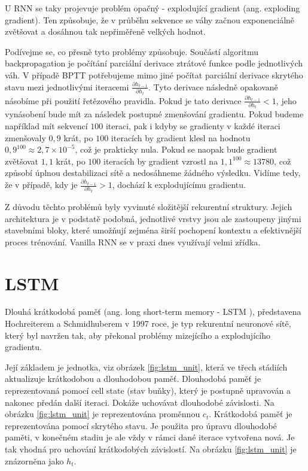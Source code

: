 U RNN se taky projevuje problém opačný - explodující gradient (ang. exploding
gradient). Ten způsobuje, že v průběhu sekvence se váhy začnou exponenciálně
zvětšovat a dosáhnou tak nepřiměřeně velkých hodnot.

Podívejme se, co přesně tyto problémy způsobuje. Součástí algoritmu
backpropagation je počítání parciální derivace ztrátové funkce podle
jednotlivých váh. V případě BPTT potřebujeme mimo jiné počítat parciální
derivace skrytého stavu mezi jednotlivými iteracemi $\frac{\partial
        h_{t-1}}{\partial h_t}$. Tyto derivace následně opakovaně násobíme při použití
řetězového pravidla. Pokud je tato derivace $\frac{\partial h_{t-1}}{\partial
        h_t}<1$, jeho vynásobení bude mít za následek postupné zmenšování gradientu.
Pokud budeme například mít sekvencí $100$ iteraci, pak i kdyby se gradienty v
každé iteraci zmenšovaly $0,9$ krát, po $100$ iteracích by gradient klesl na
hodnotu $0,9^{100} \approx 2,7 \times 10^{-5}$, což je prakticky nula. Pokud se
naopak bude gradient zvětšovat $1,1$ krát, po $100$ iteracích by gradient
vzrostl na $1,1^{100} \approx 13 780$, což způsobí úplnou destabilizaci sítě a
nedosáhneme žádného výsledku. Vidíme tedy, že v případě, kdy je $\frac{\partial
        h_{t-1}}{\partial h_t}>1$, dochází k explodujícímu gradientu.

Z důvodu těchto problémů byly vyvinuté složitější rekurentní struktury. Jejich
architektura je v podstatě podobná, jednotlivé vrstvy jsou ale zastoupeny
jinými stavebními bloky, které umožňují zejména širší pochopení kontextu a
efektivnější proces trénování. Vanilla RNN se v praxi dnes využívají velmi
zřídka.

\section{LSTM}
Dlouhá krátkodobá paměť (ang. long short-term memory - LSTM ), představena
Hochreiterem a Schmidhuberem v 1997 roce, je typ rekurentní neuronové sítě,
který byl navržen tak, aby překonal problémy mizejícího a explodujícího
gradientu.

Její základem je jednotka, viz obrázek \ref{fig:lstm_unit}, která ve třech
stádiích aktualizuje krátkodobou a dlouhodobou paměť. Dlouhodobá paměť je
reprezentovaná pomocí cell state (stav buňky), který je postupně upravován a
nakonec předán další iteraci. Dokáže uchovávat dlouhodobé závislosti. Na
obrázku \ref{fig:lstm_unit} je reprezentována proměnnou $c_t$. Krátkodobá paměť
je reprezentována pomocí skrytého stavu. Je použita pro úpravu dlouhodobé
paměti, v konečném stadiu je ale vždy v rámci dané iterace vytvořena nová. Je
tak vhodná pro uchování krátkodobých závislostí. Na obrázku \ref{fig:lstm_unit}
je znázorněna jako $h_t$.

